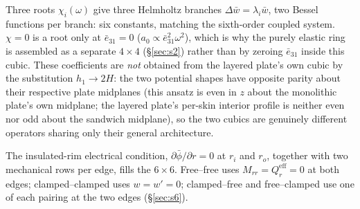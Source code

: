 \documentclass[11pt]{article}
\newcommand{\eebar}{\bar{e}_{31}}
\begin{document}
Three roots $\chi_i(\omega)$ give three Helmholtz branches
$\Delta\bar w=\lambda_i\bar w$, two Bessel functions per branch: six
constants, matching the sixth-order coupled system. $\chi=0$ is a root
only at $\eebar=0$ ($a_0\propto\eebar^2\omega^2$), which is why the
purely elastic ring is assembled as a separate $4\times4$
(\S\ref{sec:s2}) rather than by zeroing $\eebar$ inside this cubic.
These coefficients are \emph{not} obtained from the layered plate's own
cubic \cite{mccune2026piezo} by the substitution $h_1\to2H$: the two
potential shapes have opposite parity about their respective plate
midplanes (this ansatz is even in $z$ about the monolithic plate's own
midplane; the layered plate's per-skin interior profile is neither
even nor odd about the sandwich midplane), so the two cubics are genuinely different
operators sharing only their general architecture.

The insulated-rim electrical condition, $\partial\bar\phi/\partial r=0$
at $r_i$ and $r_o$, together with two mechanical rows per edge, fills
the $6\times6$. Free--free uses $M_{rr}=Q_r^{\mathrm{eff}}=0$ at both edges;
clamped--clamped uses $w=w'=0$; clamped--free and free--clamped use one
of each pairing at the two edges (\S\ref{sec:s6}).
\end{document}
